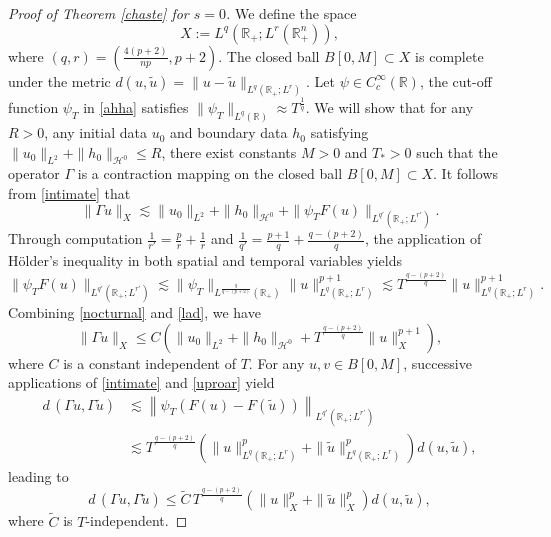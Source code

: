 \documentclass[preprint,compress,12pt]{elsarticle}
\numberwithin{equation}{section}
\begin{document}
\begin{proof}[Proof of Theorem \ref{chaste} for $s=0$]
	We define the space  $$X:=L^{q}(\mathbb{R}_{+};L^{r}(\mathbb{R}_{+}^n)),$$ where $(q,r)=\left(\frac{4(p+2)}{np},p+2\right)$. The closed ball $B[0,M]\subset X$ is complete under the metric $d(u,\tilde{u})=\|u-\tilde{u}\|_{L^{q}(\mathbb{R}_{+};L^{r})}$. Let $\psi\in C_{c}^{\infty}(\mathbb{R})$, the cut-off function $\psi_{T}$ in \eqref{ahha} satisfies  $\|\psi_{T}\|_{L^{q}(\mathbb{R})}\approx T^{\frac{1}{q}}$. We will show that for any $R>0$, any initial data $u_{0}$ and boundary data $h_{0}$ satisfying $\|u_{0}\|_{L^{2}}+\|h_{0}\|_{\mathcal{H}^{0}}\leq R$, there exist constants $M>0$ and $T_{*}>0$ such that the operator $\Gamma$ is a contraction mapping on the closed ball $B[0, M]\subset X $. It follows from \eqref{intimate} that
	\begin{equation}\label{nocturnal}
		\|\Gamma u\|_{X}\lesssim  \|u_{0}\|_{L^{2}}+\|h_{0}\|_{\mathcal{H}^{0}}+\|\psi_{T}F(u)\|_{L^{q'}(\mathbb{R}_{+};L^{r'})}.
	\end{equation}
	Through computation $\frac{1}{r'}=\frac{p}{r}+\frac{1}{r}$ and
	$\frac{1}{q'}=\frac{p+1}{q}+\frac{q-(p+2)}{q}$, the application of  H\"{o}lder's inequality in both spatial and temporal variables yields
	\begin{equation}\label{lad}
		\|\psi_{T}F(u)\|_{L^{q'}(\mathbb{R}_{+};L^{r'})}\lesssim \|\psi_{T}\|_{L^{\frac{q}{q-(p+2)}}(\mathbb{R}_{+})}\|u\|_{L^{q}(\mathbb{R}_{+};L^{r})}^{p+1}\lesssim T^{\frac{q-(p+2)}{q}} \|u\|_{L^{q}(\mathbb{R}_{+};L^{r})}^{p+1}.
	\end{equation}
	Combining \eqref{nocturnal} and \eqref{lad}, we have
	\begin{equation}\label{laptop}
		\|\Gamma u\|_{X}\leq C \left( \|u_{0}\|_{L^{2}}+\|h_{0}\|_{\mathcal{H}^{0}}+ T^{\frac{q-(p+2)}{q}} \|u\|_{X}^{p+1}\right),
	\end{equation}
	where $C$ is a constant independent of $T$. For any $u, v\in B[0,M]$,  successive applications of \eqref{intimate} and \eqref{uproar} yield
	\begin{equation*}\label{lame}
		\begin{aligned} d\,(\Gamma u,\Gamma \tilde{u})&\lesssim \left\|\psi_{T}(F(u)-F(\tilde{u}))\right\|_{L^{q'}(\mathbb{R}_{+};L^{r'})}\\
			&\lesssim T^{\frac{q-(p+2)}{q}}		\left(\|u\|_{L^{q}(\mathbb{R}_{+};L^{r})}^{p}+\|\tilde{u}\|_{L^{q}(\mathbb{R}_{+};L^{r})}^{p}\right) d(u,\tilde{u}),
		\end{aligned}
	\end{equation*}
	leading to
	\begin{equation}\label{lapse}
		d\,(\Gamma u,\Gamma \tilde{u})\leq \widetilde{C}\, T^{\frac{q-(p+2)}{q}}
		\left(\|u\|_{X}^{p}+\|\tilde{u}\|_{X}^{p}\right) d(u,\tilde{u}),
	\end{equation}
	where $\widetilde{C}$ is $T$-independent.
	

\end{proof}
\end{document}
